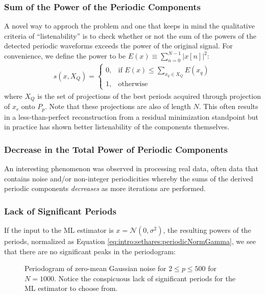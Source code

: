     \subsubsection{Sum of the Power of the Periodic Components}
    A novel way to approch the problem and one that keeps in mind the qualitative criteria of ``listenability'' is to check whether or not the sum of the powers of the detected periodic waveforms exceeds the power of the original signal. For convenience, we define the power to be $E(x) \equiv \sum_{n = 0}^{N - 1} |x[n]|^2$:
    \begin{align}
        s(x, X_Q) = \begin{cases}
            0, & \text{if } E(x) \leq \sum_{x_q \in X_Q} E(x_q) \\
            1, & \text{otherwise}
        \end{cases}
    \end{align}
    where $X_Q$ is the set of projections of the best periods acquired through projection of $x_r$ onto $P_p$. Note that these projections are also of length $N$. This often results in a less-than-perfect reconstruction from a residual minimization standpoint but in practice has shown better listenability of the components themselves.

    \subsubsection{Decrease in the Total Power of Periodic Components}
    An interesting phenomenon was observed in processing real data, often data that contains noise and/or non-integer periodicities whereby the sums of the derived periodic components \emph{decreases} as more iterations are performed.

    \subsubsection{Lack of Significant Periods}
    If the input to the ML estimator is $x = \mathcal{N}(0, \sigma^2)$, the resulting powers of the periods, normalized as Equation \eqref{eq:intro:sethares:periodicNormGamma}, we see that there are no significant peaks in the periodogram:
    \begin{figure}[h]
        \centering
        \caption[Periodogram of zero-mean Gaussian noise for $2 \leq p \leq 500$ for $N = 1000$]
        {Periodogram of zero-mean Gaussian noise for $2 \leq p \leq 500$ for $N = 1000$. Notice the conspicuous lack of significant periods for the ML estimator to choose from.}
        \label{fig:audioEffects:gaussianPeriodogram}
    \end{figure}

